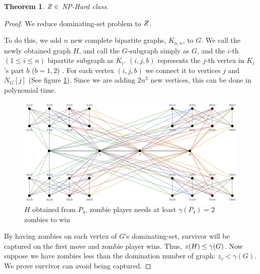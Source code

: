 \documentclass[1p]{elsarticle}
\newtheorem{theorem}{Theorem}
\newcommand{\NPZ}{\ooalign{$Z$\cr\hfil\rule[.8ex]{.3em}{.09ex}\hfil\cr}}
\newcommand{\zn}{\ooalign{$z$\cr\hfil\rule[.5ex]{.2em}{.08ex}\hfil\cr}}
\begin{document}
	\begin{theorem}
		$\NPZ \in$ NP-Hard class.
	\end{theorem}
	\begin{proof}
		We reduce dominating-set problem to $\NPZ$.

		To do this, we add $n$ new complete bipartite graphs, $K_{n,n}$, to $G$. We call the newly obtained graph $H$,
		and call the $G$-subgraph simply as $G$, and the $i$-th $(1 \leq i \leq n)$ bipartite subgraph as $K_i$.
		$(i,j,b)$ represents the $j$-th vertex in $K_i$'s part $b$ ($b = 1,2$) . For each vertex $(i,j,b)$ we connect it
		to vertices $j$ and $N_G[j]$ (See figure \ref{fig:p8}). Since we are adding $2n^2$ new vertices, this can be
		done in polynomial time.

		\begin{figure}[h!]
			\centering
			\includegraphics[width=0.9\linewidth]{fig/sec5.png}
			\caption{$H$ obtained from $P_4$, zombie player needs at least $\gamma(P_4) = 2$ zombies to win}
			\label{fig:p8}
		\end{figure}

		By having zombies on each vertex of $G$'s dominating-set, survivor will be captured on the first move and zombie
		player wins. Thus, $\zn(H) \leq \gamma(G)$. Now suppose we have zombies less than the domination number of
		graph: $z_c < \gamma(G)$. We prove survivor can avoid being captured.


\end{proof}
\end{document}
